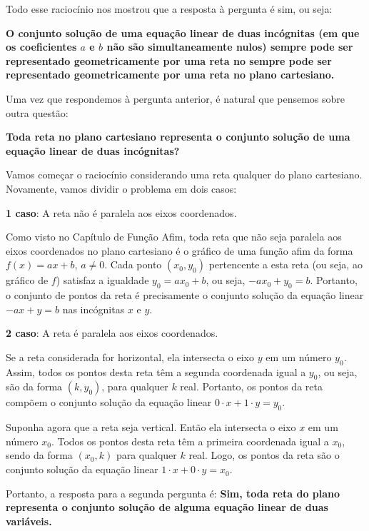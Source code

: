 \begin{observation}{}
Todo esse raciocínio nos mostrou que a resposta à pergunta é sim, ou seja:

\textbf{O conjunto solução de uma equação linear de duas incógnitas (em que os coeficientes $a$ e $b$ não são simultaneamente nulos) sempre pode ser representado geometricamente por uma reta no sempre pode ser representado geometricamente por uma reta no plano cartesiano.}

\end{observation}

Uma vez que respondemos à pergunta anterior, é natural que pensemos sobre outra questão:


\begin{observation}{}

\textbf{Toda reta no plano cartesiano representa o conjunto solução de uma equação linear de duas incógnitas?}

Vamos começar o raciocínio considerando uma reta qualquer do plano cartesiano. Novamente, vamos dividir o problema em dois casos:

\textbf{1 caso}: A reta não é paralela aos eixos coordenados.

Como visto no Capítulo de Função Afim, toda reta que não seja paralela aos eixos coordenados no plano cartesiano é o gráfico de uma função afim da forma $f(x) = ax+b$, $a\neq0$. Cada ponto $(x_0,y_0)$ pertencente a esta reta (ou seja, ao gráfico de $f$) satisfaz a igualdade $y_0=ax_0+b$, ou seja, $-ax_0+y_0=b$. Portanto, o conjunto de pontos da reta é precisamente o conjunto solução da equação linear $-ax+y=b$ nas incógnitas $x$ e $y$.

\textbf{2 caso}: A reta é paralela aos eixos coordenados.

Se a reta considerada for horizontal, ela intersecta o eixo $y$ em um número $y_0$. Assim, todos os pontos desta reta têm a segunda coordenada igual a $y_0$, ou seja, são da forma $(k, y_0)$, para qualquer $k$ real. Portanto, os pontos da reta compõem o conjunto solução da equação linear $0\cdot x+1\cdot y=y_0$.

Suponha agora que a reta seja vertical. Então ela intersecta o eixo $x$ em um número $x_0$. Todos os pontos desta reta têm a primeira coordenada igual a $x_0$, sendo da forma $(x_0,k)$ para qualquer $k$ real. Logo, os pontos da reta são o conjunto solução da equação linear $1\cdot x+0\cdot y=x_0$.

Portanto, a resposta para a segunda pergunta é: \textbf{Sim, toda reta do plano representa o conjunto solução de alguma equação linear de duas variáveis.}
\end{observation}


